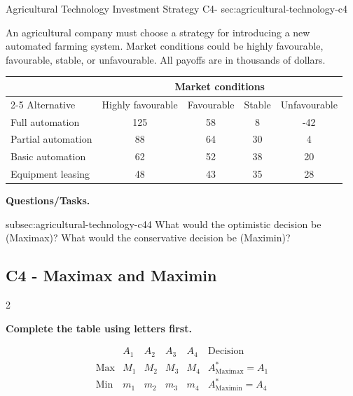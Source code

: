 	\sectionScored
	{Agricultural Technology Investment Strategy}
	{C4-}
	{sec:agricultural-technology-c4}
	{
		An agricultural company must choose a strategy for introducing a new
		automated farming system. Market conditions could be highly favourable,
		favourable, stable, or unfavourable. All payoffs are in thousands of dollars.
		
		\begin{center}
			\renewcommand{\arraystretch}{1.3}
			\small
			\begin{tabular}{lcccc}
				\toprule
				& \multicolumn{4}{c}{Market conditions} \\
				\cmidrule(lr){2-5}
				Alternative & Highly favourable & Favourable & Stable & Unfavourable \\
				\midrule
				Full automation & 125 & 58 & 8 & -42 \\
				Partial automation & 88 & 64 & 30 & 4 \\
				Basic automation & 62 & 52 & 38 & 20 \\
				Equipment leasing & 48 & 43 & 35 & 28 \\
				\bottomrule
			\end{tabular}
		\end{center}
		\vspace{-5mm}
		
		\textbf{Questions/Tasks.}
		\begin{enumerate}
			\CriterionTask
			{subsec:agricultural-technology-c4}{4}
			{What would the optimistic decision be (Maximax)? What would the conservative decision be (Maximin)? }
		\end{enumerate}
		
		\label{subsec:agricultural-technology-c4}
		\subsection*{C4 - Maximax and Maximin }
		
		
		\begin{multicols}{2}
			
			\textbf{Complete the table using letters first.}
			
			\[
			\begin{array}{c|ccccc}
				& A_1 & A_2 & A_3 & A_4 & \text{Decision}\\
				\hline
				\text{Max} &
				M_1 & M_2 & M_3 & M_4 &
				A^*_{\mathrm{Maximax}}=A_1
				\\
				\text{Min} &
				m_1 & m_2 & m_3 & m_4 &
				A^*_{\mathrm{Maximin}}=A_4
			\end{array}
				\]
				

\end{multicols}}
